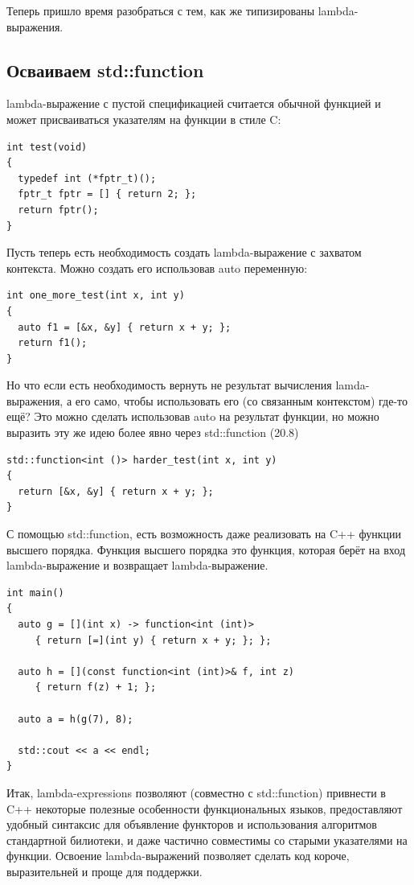\documentclass[a4paper,12pt,oneside]{article}
\begin{document}
Теперь пришло время разобраться с тем, как же типизированы lambda-выражения.

\subsection{Осваиваем std::function}

lambda-выражение с пустой спецификацией считается обычной функцией и может присваиваться указателям на функции в стиле C:

\begin{lstlisting}
int test(void)
{
  typedef int (*fptr_t)();
  fptr_t fptr = [] { return 2; };
  return fptr();
}
\end{lstlisting}

Пусть теперь есть необходимость создать lambda-выражение с захватом контекста. Можно создать его использовав auto переменную:

\begin{lstlisting}
int one_more_test(int x, int y)
{
  auto f1 = [&x, &y] { return x + y; };
  return f1(); 
}
\end{lstlisting}

Но что если есть необходимость вернуть не результат вычисления lamda-выражения, а его само, чтобы использовать его (со связанным контекстом) где-то ещё? Это можно сделать использовав auto на результат функции, но можно выразить эту же идею более явно через std::function (20.8)
 
\begin{lstlisting}
std::function<int ()> harder_test(int x, int y)
{
  return [&x, &y] { return x + y; };
}
\end{lstlisting}

С помощью std::function, есть возможность даже реализовать на C++ функции высшего порядка. Функция высшего порядка это функция, которая берёт на вход lambda-выражение и возвращает lambda-выражение.

\begin{lstlisting}
int main()
{
  auto g = [](int x) -> function<int (int)> 
     { return [=](int y) { return x + y; }; };

  auto h = [](const function<int (int)>& f, int z) 
     { return f(z) + 1; };

  auto a = h(g(7), 8);

  std::cout << a << endl;
}
\end{lstlisting}

Итак, lambda-expressions позволяют (совместно с std::function) привнести в C++ некоторые полезные особенности функциональных языков, предоставляют удобный синтаксис для объявление функторов и использования алгоритмов стандартной билиотеки, и даже частично совместимы со старыми указателями на функции. Освоение lambda-выражений позволяет сделать код короче, выразительней и проще для поддержки.
\end{document}
